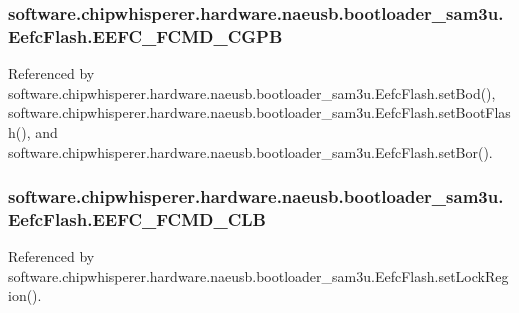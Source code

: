 \subsubsection[{E\+E\+F\+C\+\_\+\+F\+C\+M\+D\+\_\+\+C\+G\+P\+B}]{\setlength{\rightskip}{0pt plus 5cm}software.\+chipwhisperer.\+hardware.\+naeusb.\+bootloader\+\_\+sam3u.\+Eefc\+Flash.\+E\+E\+F\+C\+\_\+\+F\+C\+M\+D\+\_\+\+C\+G\+P\+B}\label{classsoftware_1_1chipwhisperer_1_1hardware_1_1naeusb_1_1bootloader__sam3u_1_1EefcFlash_ad1509f6e5a145686678d0c46c85582fe}


Referenced by software.\+chipwhisperer.\+hardware.\+naeusb.\+bootloader\+\_\+sam3u.\+Eefc\+Flash.\+set\+Bod(), software.\+chipwhisperer.\+hardware.\+naeusb.\+bootloader\+\_\+sam3u.\+Eefc\+Flash.\+set\+Boot\+Flash(), and software.\+chipwhisperer.\+hardware.\+naeusb.\+bootloader\+\_\+sam3u.\+Eefc\+Flash.\+set\+Bor().

\hypertarget{classsoftware_1_1chipwhisperer_1_1hardware_1_1naeusb_1_1bootloader__sam3u_1_1EefcFlash_a45d9ac8d808155951bf76511d813b3cb}{}
\subsubsection[{E\+E\+F\+C\+\_\+\+F\+C\+M\+D\+\_\+\+C\+L\+B}]{\setlength{\rightskip}{0pt plus 5cm}software.\+chipwhisperer.\+hardware.\+naeusb.\+bootloader\+\_\+sam3u.\+Eefc\+Flash.\+E\+E\+F\+C\+\_\+\+F\+C\+M\+D\+\_\+\+C\+L\+B}\label{classsoftware_1_1chipwhisperer_1_1hardware_1_1naeusb_1_1bootloader__sam3u_1_1EefcFlash_a45d9ac8d808155951bf76511d813b3cb}


Referenced by software.\+chipwhisperer.\+hardware.\+naeusb.\+bootloader\+\_\+sam3u.\+Eefc\+Flash.\+set\+Lock\+Region().

\hypertarget{classsoftware_1_1chipwhisperer_1_1hardware_1_1naeusb_1_1bootloader__sam3u_1_1EefcFlash_a8ddd9036e03e3ed283bce5698f77a365}{}
